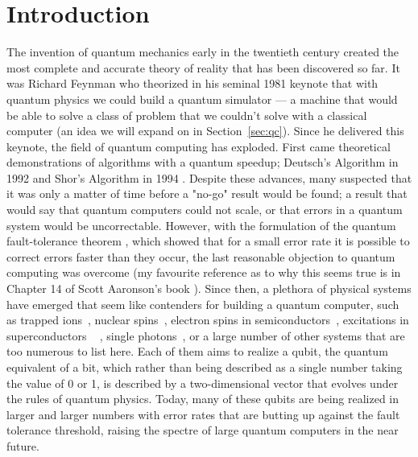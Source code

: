 \chapter{Introduction}

The invention of quantum mechanics early in the twentieth century created the most complete and accurate
theory of reality that has been discovered so far. It was Richard Feynman who theorized in his
seminal 1981 keynote \cite{Feynman1982} that with quantum physics we could build a quantum simulator ---
a machine that would be able to solve a class of problem that we couldn't solve with a
classical computer (an idea we will expand on in Section~\ref{sec:qc}). Since he delivered this keynote, the
field of quantum computing has exploded. First came theoretical demonstrations of algorithms
with a quantum speedup; Deutsch's Algorithm in 1992 \cite{Deutsch} and Shor's Algorithm in 1994 \cite{Shor}.
Despite these advances, many suspected that it was only a matter of time before a "no-go" result would
be found; a result that would say that quantum computers could not scale, or that errors in a quantum system would be uncorrectable.
However, with the formulation of the quantum fault-tolerance theorem \cite{1996quant.ph.11025A}, which
showed that for a small error rate it is possible to correct errors faster than they occur, the last
reasonable objection to quantum computing was overcome (my favourite reference as to why this seems true
is in Chapter 14 of Scott Aaronson's book \cite{Aaronson:skepticism}). Since then, a plethora of physical
systems have emerged that seem like contenders for building a quantum computer, such as trapped
ions~\cite{doi:10.1063/1.5088164}, nuclear spins~\cite{acs.nanolett.8b00006}, electron spins in
semiconductors~\cite{RevModPhys.79.1217}, excitations in superconductors ~ \cite{Wendin_2017},
single photons~\cite{OBrien1567}, or a large number of other systems that are too numerous to list here.
Each of them aims to realize a qubit, the quantum equivalent of a bit, which rather than being described as a
single number taking the value of 0 or 1, is described by a two-dimensional vector that evolves under the rules
of quantum physics. Today, many of these qubits are being realized in larger and larger numbers with error rates
that are butting up against the fault tolerance threshold, raising the spectre of large quantum computers
in the near future.

